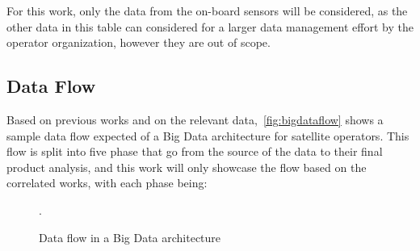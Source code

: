 For this work, only the data from the on-board sensors will be considered, as the other data in this table can considered for a larger data management effort by the operator organization, however they are out of scope.

\subsection{Data Flow}\label{ch:corr:dataflow}

Based on previous works and on the relevant data,~\autoref{fig:bigdataflow} shows a sample data flow expected of a Big Data architecture for satellite operators.
This flow is split into five phase that go from the source of the data to their final product analysis, and this work will only showcase the flow based on the correlated works, with each phase being:

\begin{figure}[ht]
  \caption{Data flow in a Big Data architecture}\label{fig:bigdataflow}
  \vspace{6mm}
  \begin{center}
  \end{center}
  \vspace{2mm}
  \legenda{}
  .
\end{figure}

